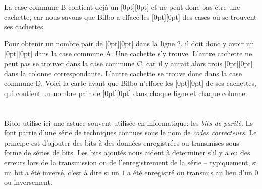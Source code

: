 {{La case commune B contient déjà un \raisebox{\dimexpr -0.5ex +0.3ex \relax}[0pt][0pt]{} et ne peut donc pas être une cachette, car nous savons que Bilbo a effacé les \raisebox{\dimexpr -0.5ex +0.3ex \relax}[0pt][0pt]{} des cases où se trouvent ses cachettes.

Pour obtenir un nombre pair de \raisebox{\dimexpr -0.5ex +0.3ex \relax}[0pt][0pt]{} dans la ligne $2$, il doit donc y avoir un \raisebox{\dimexpr -0.5ex +0.3ex \relax}[0pt][0pt]{} dans la case commune A. Une cachette s’y trouve. L’autre cachette ne peut pas se trouver dans la case commune C, car il y aurait alors trois \raisebox{\dimexpr -0.5ex +0.3ex \relax}[0pt][0pt]{} dans la colonne correspondante. L’autre cachette se trouve donc dans la case commune D. Voici la carte avant que Bilbo n’efface les \raisebox{\dimexpr -0.5ex +0.3ex \relax}[0pt][0pt]{} de ses cachettes, qui contient un nombre pair de \raisebox{\dimexpr -0.5ex +0.3ex \relax}[0pt][0pt]{} dans chaque ligne et chaque colonne:

{\centering%
\par}



\section*{\BrochureItsInformatics}
Biblo utilise ici une astuce souvent utilisée en informatique: les \emph{bits de parité}. Ils font partie d’une série de techniques connues sous le nom de \emph{codes correcteurs}. Le principe est d’ajouter des bits à des données enregistrées ou transmises sous forme de séries de bits. Les bits ajoutés nous aident à determiner s’il y a eu des erreurs lors de la transmission ou de l’enregistrement de la série – typiquement, si un bit a été inversé, c’est à dire si un $1$ a été enregistré ou transmis au lieu d’un $0$ ou inversement.

}}
